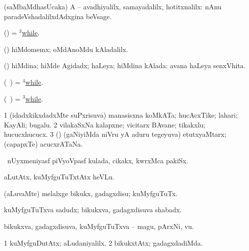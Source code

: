 \bentry
{} 
\gl{\kirxvi}
\expl{}
\bmng
(saMbaMdhasUcaka) A -- avadhiyalilx, samayadalilx, hotitxnalilx:  nAnu paradeVshadalilxdAdxgina beVsage. 
\emng
\eentry

\bentry
{} 
\gl{\saMavayx}
\expl{}
\bmng
(\pArxparx) = \hyperlink{while(3)}{$^3$while}. 
\emng
\eentry

\bentry
{} 
\gl{\kirxvi}
\expl{}
\bmng
(\pArxparx) hiMdomemx; oMdAnoMdu kAladalilx. 
\emng
\eentry

\bentry
{} 
\gl{\gu}
\expl{}
\bmng
(\pArxparx) hiMdina; hiMde Agidadx; haLeya; hiMdina kAlada:  avana haLeya senxVhita. 
\emng
\eentry

\bentry
{} 
\gl{\kirxvi}
\expl{}
\bmng
(\kanmu\ \birx) = \hyperlink{while(4)}{$^4$while}. 
\emng
\eentry

\bentry
{} 
\gl{\saMavayx}
\expl{}
\bmng
(\kanmu\ \birx) = \hyperlink{while(3)}{$^3$while}. 
\emng
\eentry

\bentry 
{} 
\gl{\nA}
\expl{}
\bmng
\bnum
\num{1} (idadxkikxdadxMte suPxrisuva) manasisxna koMkATa; hucAcxTike; lahari; KayAli; bugalu. 
\num{2} vilakaSxNa kalapxne; vicitarx BAvane; tikakxlu; hucucxhucucx. 
\num{3} (\pArxparx) (gaNiyiMda niVru yA aduru tegeyuva) etutxyaMtarx; (capapxTe) acucxrATaNa. 
\enum
\emng
\eentry

\bentry
{} 
\gl{\nA}
\expl{}
\bmng
\kanmu\ nUyxmeniyasf piVyoVpasf kulada, cikakx, kwrxMca pakiSx. 
\emng
\eentry

\bentry
{} 
\gl{\sakirx}
\expl{}
\bmng
aLutAtx, kuMyfguTuTxtAtx heVLu. 
\emng

\noindent 
\gl{\akirx}
\expl{}
\bmng
(aLuvaMte) melalxge bikukx, gadagxdisu; kuMyfguTuTx. 
\emng
\eentry

\bentry
{} 
\gl{\nA}
\expl{}
\bmng
kuMyfguTuTxva sadudx; bikukxva, gadagxdisuva shabadx. 
\emng
\eentry

\bentry
{} 
\gl{\nA}
\bmng
bikukxva, gadagxdisuva, kuMyfguTuTxva -- magu, pArxNi, \mo vu. 
\emng
\eentry

\bentry
{} 
\gl{\kirxvi}
\expl{}
\bmng
\bnum
\num{1} kuMyfguDutAtx; aLudaniyalilx. 
\num{2} bikukxtAtx; gadagxdadiMda. 
\enum
\emng
\eentry

